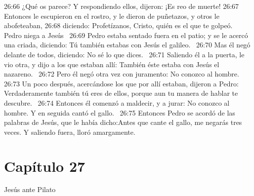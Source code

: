 26:66 ¿Qué os parece? Y respondiendo ellos, dijeron: ¡Es reo de muerte! 
26:67 Entonces le escupieron en el rostro, y le dieron de puñetazos, y otros le abofeteaban, 
26:68 diciendo: Profetízanos, Cristo, quién es el que te golpeó.  
Pedro niega a Jesús  
26:69 Pedro estaba sentado fuera en el patio; y se le acercó una criada, diciendo: Tú también estabas con Jesús el galileo.  
26:70 Mas él negó delante de todos, diciendo: No sé lo que dices.  
26:71 Saliendo él a la puerta, le vio otra, y dijo a los que estaban allí: También éste estaba con Jesús el nazareno.  
26:72 Pero él negó otra vez con juramento: No conozco al hombre.  
26:73 Un poco después, acercándose los que por allí estaban, dijeron a Pedro: Verdaderamente también tú eres de ellos, porque aun tu manera de hablar te descubre.  
26:74 Entonces él comenzó a maldecir, y a jurar: No conozco al hombre. Y en seguida cantó el gallo.  
26:75 Entonces Pedro se acordó de las palabras de Jesús, que le había dicho:Antes que cante el gallo, me negarás tres veces. Y saliendo fuera, lloró amargamente.  
\section*{Capítulo 27}
Jesús ante Pilato   

